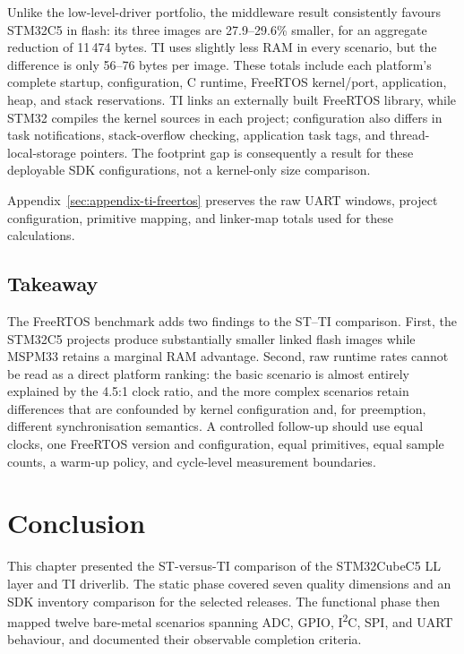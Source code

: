 Unlike the low-level-driver portfolio, the middleware result consistently favours STM32C5 in
flash: its three images are 27.9--29.6\% smaller, for an aggregate reduction of 11\,474 bytes.
TI uses slightly less RAM in every scenario, but the difference is only 56--76 bytes per image.
These totals include each platform's complete startup, configuration, C runtime, FreeRTOS
kernel/port, application, heap, and stack reservations. TI links an externally built FreeRTOS
library, while STM32 compiles the kernel sources in each project; configuration also differs in
task notifications, stack-overflow checking, application task tags, and thread-local-storage
pointers. The footprint gap is consequently a result for these deployable SDK configurations,
not a kernel-only size comparison.

Appendix~\ref{sec:appendix-ti-freertos} preserves the raw UART windows, project configuration,
primitive mapping, and linker-map totals used for these calculations.

\subsection{Takeaway}
\label{subsec:ti-freertos-takeaway}

The FreeRTOS benchmark adds two findings to the ST--TI comparison. First, the STM32C5 projects
produce substantially smaller linked flash images while MSPM33 retains a marginal RAM
advantage. Second, raw runtime rates cannot be read as a direct platform ranking: the basic
scenario is almost entirely explained by the 4.5:1 clock ratio, and the more complex scenarios
retain differences that are confounded by kernel configuration and, for preemption, different
synchronisation semantics. A controlled follow-up should use equal clocks, one FreeRTOS version
and configuration, equal primitives, equal sample counts, a warm-up policy, and cycle-level
measurement boundaries.


\newpage
\section*{Conclusion}
This chapter presented the ST-versus-TI comparison of the STM32CubeC5 LL layer and TI
driverlib. The static phase covered seven quality dimensions and an SDK inventory comparison
for the selected releases. The functional phase then mapped twelve bare-metal scenarios spanning ADC, GPIO,
I\textsuperscript{2}C, SPI, and UART behaviour, and documented their observable completion
criteria.

